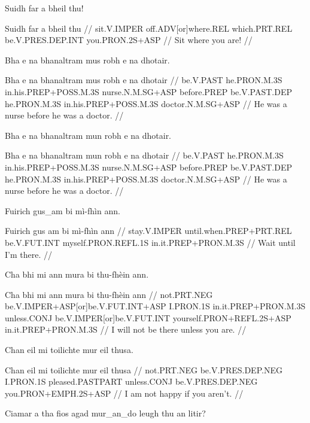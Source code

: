 \documentclass[a4paper,10pt]{article}
\begin{document}
\ex
\begingl
\glpre Suidh far a bheil thu! 

\vspace{4mm}
\gla Suidh far a bheil thu  //
\glb sit.V.IMPER off.ADV[or]where.REL which.PRT.REL be.V.PRES.DEP.INT you.PRON.2S+ASP  //
\glft Sit where you are! //
\endgl
\xe

\ex
\begingl
\glpre Bha e na bhanaltram mus robh e na dhotair. 

\vspace{4mm}
\gla Bha e na bhanaltram mus robh e na dhotair  //
\glb be.V.PAST he.PRON.M.3S in.his.PREP+POSS.M.3S nurse.N.M.SG+ASP before.PREP be.V.PAST.DEP he.PRON.M.3S in.his.PREP+POSS.M.3S doctor.N.M.SG+ASP  //
\glft He was a nurse before he was a doctor. //
\endgl
\xe

\ex
\begingl
\glpre Bha e na bhanaltram mun robh e na dhotair. 

\vspace{4mm}
\gla Bha e na bhanaltram mun robh e na dhotair  //
\glb be.V.PAST he.PRON.M.3S in.his.PREP+POSS.M.3S nurse.N.M.SG+ASP before.PREP be.V.PAST.DEP he.PRON.M.3S in.his.PREP+POSS.M.3S doctor.N.M.SG+ASP  //
\glft He was a nurse before he was a doctor. //
\endgl
\xe

\ex
\begingl
\glpre Fuirich gus\_am bi mì-fhìn ann. 

\vspace{4mm}
\gla Fuirich {gus am} bi mì-fhìn ann  //
\glb stay.V.IMPER until.when.PREP+PRT.REL be.V.FUT.INT myself.PRON.REFL.1S in.it.PREP+PRON.M.3S  //
\glft Wait until I'm there. //
\endgl
\xe

\ex
\begingl
\glpre Cha bhi mi ann mura bi thu-fhèin ann. 

\vspace{4mm}
\gla Cha bhi mi ann mura bi thu-fhèin ann  //
\glb not.PRT.NEG be.V.IMPER+ASP[or]be.V.FUT.INT+ASP I.PRON.1S in.it.PREP+PRON.M.3S unless.CONJ be.V.IMPER[or]be.V.FUT.INT yourself.PRON+REFL.2S+ASP in.it.PREP+PRON.M.3S  //
\glft I will not be there unless you are. //
\endgl
\xe

\ex
\begingl
\glpre Chan eil mi toilichte mur eil thusa. 

\vspace{4mm}
\gla Chan eil mi toilichte mur eil thusa  //
\glb not.PRT.NEG be.V.PRES.DEP.NEG I.PRON.1S pleased.PASTPART unless.CONJ be.V.PRES.DEP.NEG you.PRON+EMPH.2S+ASP  //
\glft I am not happy if you aren't. //
\endgl
\xe

\ex
\begingl
\glpre Ciamar a tha fios agad mur\_an\_do leugh thu an litir? 
\end{document}
